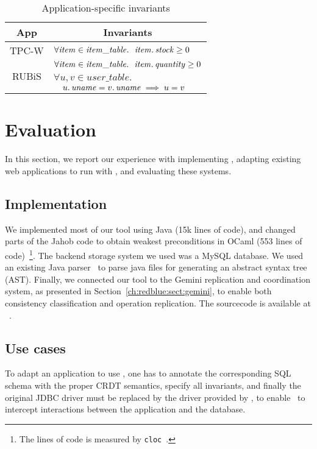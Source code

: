 \begin{table}[t]
\centering
\begin{tabular}{|c|l|}
\hline
App & \multicolumn{1}{c|}{Invariants}\\\hline
TPC-W & $\forall \mathit{item} \in \mathit{item\_table}.~\  \mathit{item}\ldotp\mathit{stock} \geq 0$ \\\hline
\multirow{3}{*}{RUBiS} & $\forall \mathit{item} \in \mathit{item\_table}.~\ \mathit{item}\ldotp\mathit{quantity} \geq 0$\\
\cline{2-2}
& $\forall u, v \in \mathit{user\_table}.~$ \\
& $\quad u\ldotp\mathit{uname} = v\ldotp\mathit{uname} \implies u = v$\\\hline
\end{tabular}
\caption{Application-specific invariants}
\label{tab:staticinvariants}
\end{table}

\section{Evaluation}
\label{ch:sieve:sect:evaluation}
In this section, we report our experience with implementing \tool,
adapting existing web applications to run with \tool, and evaluating
these systems.

\subsection{Implementation}
We implemented most of our tool using Java (15k lines of code), and changed parts of the Jahob code
to obtain weakest preconditions in OCaml (553 lines of code)~\footnote{The lines of code is
measured by {\tt cloc}~\cite{codecounter}.}. The
backend storage system we used was a MySQL database. We used
an existing Java parser~\cite{javaparser} to parse java files for generating an
abstract syntax tree (AST). Finally, we connected our tool
to the Gemini replication and coordination system, as presented in Section~\ref{ch:redblue:sect:gemini}, to enable both
consistency classification and operation replication. The sourcecode is available at ~\cite{SIEVESource}.

\subsection{Use cases}
To adapt an application to use \tool, one has to annotate the
corresponding SQL schema with the proper CRDT semantics, specify
all invariants, and finally the original JDBC driver must be replaced
by the driver provided by \tool, to enable
\tool\ to intercept interactions between the application and the database.

